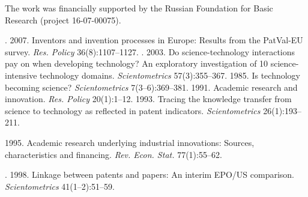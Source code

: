 



\Ack
\noindent
The work was financially supported 
by the Russian Foundation for Basic Research (project 16-07-00075).


\vspace*{9pt}

  \begin{multicols}{2}

\renewcommand{\bibname}{\protect\rmfamily References}

{\small\frenchspacing
 {%
 \begin{thebibliography}{99}
. 2007. Inventors 
and invention processes in Europe: Results from the PatVal-EU survey. \textit{Res. Policy} 
36(8):1107--1127.
. 
2003. Do science-technology interactions pay on when developing technology? An exploratory 
investigation of 10 science-intensive technology domains. \textit{Scientometrics} 57(3):355--367.
 1985. Is technology becoming science? \textit{Scientometrics}  
7(3--6):369--381.
 1991. Academic research and innovation. \textit{Res. Policy} 20(1):1--12.
 1993. Tracing the knowledge transfer from science to technology as reflected in 
patent indicators. \textit{Scientometrics} 26(1):193--211.

 1995. Academic research underlying industrial innovations: Sources, 
characteristics and financing. \textit{Rev. Econ. Stat.} 77(1):55--62.

. 1998. Linkage between patents and papers: An interim EPO/US 
comparison. \textit{Scientometrics} 41(1--2):51--59.



\end{thebibliography}}}
\end{multicols}
